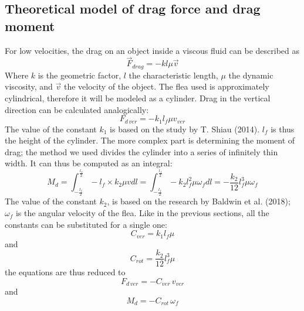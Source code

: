 \documentclass[10pt,a4paper]{article}
\begin{document}
\subsection{Theoretical model of drag force and drag moment}
For low velocities, the drag on an object inside a viscous fluid can be described as
\begin{equation}
\vec{F}_{drag} = - k l \mu \vec{v}
\label{dragobecne}
\end{equation}
Where $k$ is the geometric factor, $l$ the characteristic length, $\mu$ the dynamic viscosity, and $\vec{v}$ the velocity of the object. The flea used is approximately cylindrical, therefore it will be modeled as a cylinder. Drag in the vertical direction can be calculated analogically:
\begin{equation}
F_{d\, ver} = - k_1 l_{f} \mu v_{ver}
\label{dragsv}
\end{equation}
The value of the constant $k_1$ is based on the study by T. Shiau (2014). $l_f$ is thus the height of the cylinder. The more complex part is determining the moment of drag; the method we used divides the cylinder into a series of infinitely thin width. It can thus be computed as an integral:
\begin{equation}
 M_{d} = \int_{-\frac{l_f}{2}}^{\frac{l_f}{2}} - l_f \times k_2 \mu v dl = \int_{-\frac{l_f}{2}}^{\frac{l_f}{2}} - k_2 l_f^2 \mu \omega_f dl = - \frac{k_2}{12}l_f^3 \mu \omega_f 
 \label{dragrot}
 \end{equation}
The value of the constant $k_2$, is based on the research by Baldwin et al. (2018); $\omega_f$ is the angular velocity of the flea. Like in the previous sections, all the constants can be substituted for a single one:
\begin{equation}
 C_{ver} = k_1 l_{f} \mu 
 \label{cverdef}
 \end{equation}
and
\begin{equation}
 C_{rot} = \frac{k_2}{12}l_f^3 \mu 
 \label{crotdef}
 \end{equation}
the equations are thus reduced to
\begin{equation}
 F_{d \, ver} = - C_{ver} \, v_{ver}
 \label{Fdragfinal}
 \end{equation}
and
\begin{equation}
 M_{d} = - C_{rot} \, \omega_f 
 \label{Mdragfinal}
 \end{equation}
\end{document}
